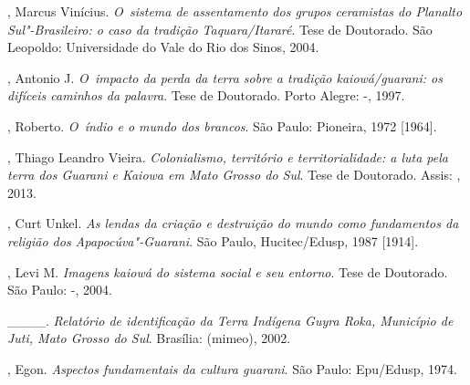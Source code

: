 \begin{Parskip}
, Marcus Vinícius. \emph{O~sistema de assentamento dos grupos ceramistas
do Planalto Sul"-Brasileiro: o caso da tradição Taquara/Itararé}. Tese de
Doutorado. São Leopoldo: Universidade do Vale do Rio dos Sinos, 2004.

, Antonio J. \emph{O~impacto da perda da terra sobre a tradição
kaiowá/guarani: os difíceis caminhos da palavra}. Tese de Doutorado.
Porto Alegre: -, 1997.

, Roberto. \emph{O~índio e o mundo dos brancos}. São Paulo:
Pioneira, 1972 [1964].

, Thiago Leandro Vieira. \emph{Colonialismo, território e
territorialidade: a luta pela terra dos Guarani e Kaiowa em Mato Grosso
do Sul}. Tese de Doutorado. Assis: , 2013.

, Curt Unkel. \emph{As lendas da criação e destruição do mundo como
fundamentos da religião dos Apapocúva"-Guarani}. São Paulo,
Hucitec/Edusp, 1987 [1914].

, Levi M. \emph{Imagens kaiowá do sistema social e seu entorno}. Tese de
Doutorado. São Paulo: -, 2004.

\_\_\_\_. \emph{Relatório de identificação da Terra Indígena Guyra Roka,
Município de Juti, Mato Grosso do Sul}. Brasília:  (mimeo), 2002.

, Egon. \emph{Aspectos fundamentais da cultura guarani}. São Paulo:
Epu/Edusp, 1974.
\end{Parskip}

\clearpage

\vspace*{\fill}

